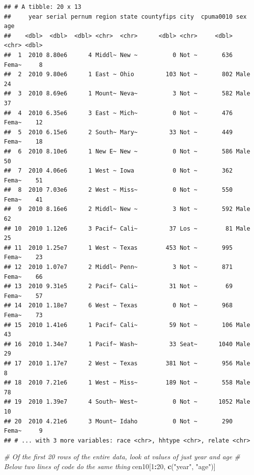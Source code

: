 \documentclass[]{book}
\newenvironment{Shaded}{\begin{snugshade}}{\end{snugshade}}
\newcommand{\CommentTok}[1]{\textcolor[rgb]{0.56,0.35,0.01}{\textit{#1}}}
\newcommand{\DecValTok}[1]{\textcolor[rgb]{0.00,0.00,0.81}{#1}}
\newcommand{\KeywordTok}[1]{\textcolor[rgb]{0.13,0.29,0.53}{\textbf{#1}}}
\newcommand{\NormalTok}[1]{#1}
\newcommand{\OperatorTok}[1]{\textcolor[rgb]{0.81,0.36,0.00}{\textbf{#1}}}
\newcommand{\StringTok}[1]{\textcolor[rgb]{0.31,0.60,0.02}{#1}}
\theoremstyle{definition}
\theoremstyle{definition}
\theoremstyle{definition}
\theoremstyle{remark}
\begin{document}
\begin{Shaded}
\end{Shaded}

\begin{verbatim}
## # A tibble: 20 x 13
##     year serial pernum region state countyfips city  cpuma0010 sex     age
##    <dbl>  <dbl>  <dbl> <chr>  <chr>      <dbl> <chr>     <dbl> <chr> <dbl>
##  1  2010 8.80e6      4 Middl~ New ~          0 Not ~       636 Fema~     8
##  2  2010 9.80e6      1 East ~ Ohio         103 Not ~       802 Male     24
##  3  2010 8.69e6      1 Mount~ Neva~          3 Not ~       582 Male     37
##  4  2010 6.35e6      3 East ~ Mich~          0 Not ~       476 Fema~    12
##  5  2010 6.15e6      2 South~ Mary~         33 Not ~       449 Fema~    18
##  6  2010 8.10e6      1 New E~ New ~          0 Not ~       586 Male     50
##  7  2010 4.06e6      1 West ~ Iowa           0 Not ~       362 Fema~    51
##  8  2010 7.03e6      2 West ~ Miss~          0 Not ~       550 Fema~    41
##  9  2010 8.16e6      2 Middl~ New ~          3 Not ~       592 Male     62
## 10  2010 1.12e6      3 Pacif~ Cali~         37 Los ~        81 Male     25
## 11  2010 1.25e7      1 West ~ Texas        453 Not ~       995 Fema~    23
## 12  2010 1.07e7      2 Middl~ Penn~          3 Not ~       871 Fema~    66
## 13  2010 9.31e5      2 Pacif~ Cali~         31 Not ~        69 Fema~    57
## 14  2010 1.18e7      6 West ~ Texas          0 Not ~       968 Fema~    73
## 15  2010 1.41e6      1 Pacif~ Cali~         59 Not ~       106 Male     43
## 16  2010 1.34e7      1 Pacif~ Wash~         33 Seat~      1040 Male     29
## 17  2010 1.17e7      2 West ~ Texas        381 Not ~       956 Male      8
## 18  2010 7.21e6      1 West ~ Miss~        189 Not ~       558 Male     78
## 19  2010 1.39e7      4 South~ West~          0 Not ~      1052 Male     10
## 20  2010 4.21e6      3 Mount~ Idaho          0 Not ~       290 Fema~     9
## # ... with 3 more variables: race <chr>, hhtype <chr>, relate <chr>
\end{verbatim}

\begin{Shaded}
\begin{Highlighting}[]
\CommentTok{# Of the first 20 rows of the entire data, look at values of just year and age}
\CommentTok{# Below two lines of code do the same thing}
\NormalTok{cen10[}\DecValTok{1}\OperatorTok{:}\DecValTok{20}\NormalTok{, }\KeywordTok{c}\NormalTok{(}\StringTok{"year"}\NormalTok{, }\StringTok{"age"}\NormalTok{)]}
\end{Highlighting}
\end{Shaded}
\end{document}
